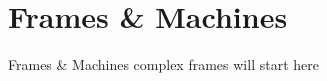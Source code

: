 \documentclass[9pt,xcolor={svgnames, x11names}]{beamer}
\begin{document}

\section{Frames \& Machines}

\begin{frame}{Frames \& Machines}
  complex frames will start here
\end{frame}
\end{document}
